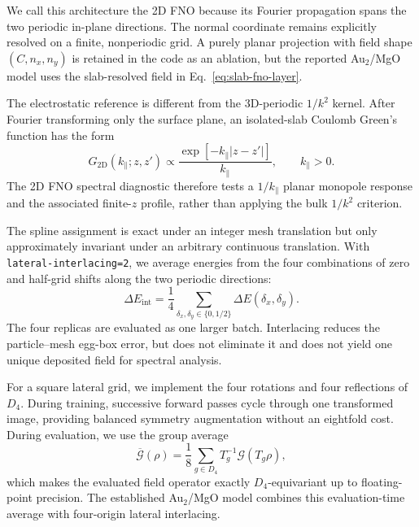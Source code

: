 \documentclass[11pt]{article}
\newcommand{\code}[1]{\texttt{#1}}
\begin{document}
We call this architecture the 2D FNO because its Fourier propagation spans the
two periodic in-plane directions. The normal coordinate remains explicitly
resolved on a finite, nonperiodic grid. A purely planar projection with field
shape \((C,n_x,n_y)\) is retained in the code as an ablation, but the reported
Au$_2$/MgO model uses the slab-resolved field in Eq.~\eqref{eq:slab-fno-layer}.

The electrostatic reference is different from the 3D-periodic \(1/k^2\)
kernel. After Fourier transforming only the surface plane, an isolated-slab
Coulomb Green's function has the form
\begin{equation}
 G_{2\mathrm D}(k_\parallel;z,z')\propto
 \frac{\exp[-k_\parallel|z-z'|]}{k_\parallel},\qquad k_\parallel>0.
 \label{eq:slab-green-function}
\end{equation}
The 2D FNO spectral diagnostic therefore tests a \(1/k_\parallel\) planar
monopole response and the associated finite-\(z\) profile, rather than applying
the bulk \(1/k^2\) criterion.

The spline assignment is exact under an integer mesh translation but only
approximately invariant under an arbitrary continuous translation. With
\code{lateral-interlacing=2}, we average energies from the four combinations
of zero and half-grid shifts along the two periodic directions:
\begin{equation}
 \Delta E_{\mathrm{int}}
 =\frac{1}{4}\sum_{\delta_x,\delta_y\in\{0,1/2\}}
 \Delta E(\delta_x,\delta_y).
 \label{eq:slab-interlacing}
\end{equation}
The four replicas are evaluated as one larger batch. Interlacing reduces the
particle--mesh egg-box error, but does not eliminate it and does not yield one
unique deposited field for spectral analysis.

For a square lateral grid, we implement the four rotations and four
reflections of \(D_4\). During training, successive forward passes cycle
through one transformed image, providing balanced symmetry augmentation
without an eightfold cost. During evaluation, we use the group average
\begin{equation}
 \overline{\mathcal G}(\rho)
 =\frac{1}{8}\sum_{g\in D_4}
 T_g^{-1}\mathcal G(T_g\rho),
 \label{eq:d4-average}
\end{equation}
which makes the evaluated field operator exactly \(D_4\)-equivariant up to
floating-point precision. The established Au$_2$/MgO model combines this
evaluation-time average with four-origin lateral interlacing.
\end{document}
